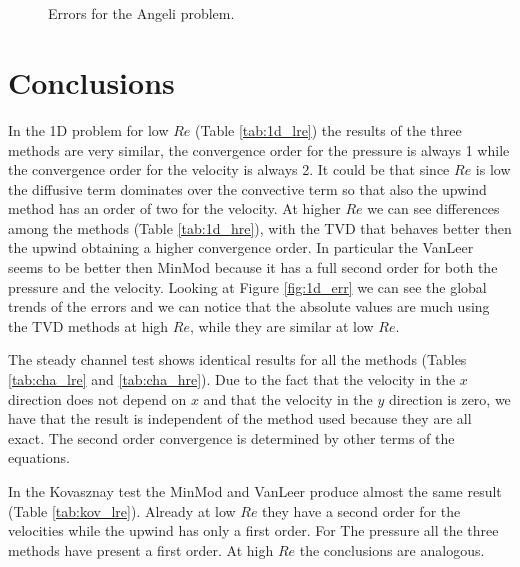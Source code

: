 \documentclass[11pt, a4paper]{article}
\theoremstyle{definition}
\begin{document}
\begin{figure}[t]
	\centering
	\subfloat[][Angeli, Upwind, $Re = 1$]{
		}
	\subfloat[][Angeli, Upwind, $Re = 1000$]{
		}\\
	\subfloat[][Angeli, MinMod, $Re = 1$]{
		}
	\subfloat[][Angeli, MinMod, $Re = 1000$]{
		}\\
	\subfloat[][Angeli, VanLeer, $Re = 1$]{
		}
	\subfloat[][Angeli, VanLeer, $Re = 1000$]{
		}
	\caption{Errors for the Angeli problem.}
	\label{fig:ang_err}
\end{figure}

\section{Conclusions}
In the 1D problem for low $Re$ (Table \ref{tab:1d_lre}) the results of the 
three 
methods are very similar, the convergence order for the pressure is always 1 
while the convergence order for the velocity is always 2. It could be that 
since $Re$ is low the diffusive term dominates over the convective term so that 
also the upwind method has an order of two for the velocity. At higher 
$Re$ we can see differences among the methods (Table \ref{tab:1d_hre}), with 
the TVD 
that behaves better then the upwind obtaining a  higher convergence order. In 
particular the VanLeer seems to be 
better then MinMod because it has a full second order for both the pressure and 
the velocity. Looking at Figure \ref{fig:1d_err} we can see the global trends 
of the errors and we can notice that the absolute values are much using the TVD 
methods at high $Re$, while they are similar at low $Re$.

The steady channel test shows identical results for all the methods (Tables 
\ref{tab:cha_lre} and \ref{tab:cha_hre}). Due to the 
fact that the velocity in the $x$ direction does not depend on $x$ and that the 
velocity in the $y$ direction is zero, we have that the result is independent 
of the method used because they are all exact. The second order convergence is 
determined by other terms of the equations.

In the Kovasznay test the MinMod and VanLeer produce almost the same result 
(Table \ref{tab:kov_lre}). Already at low $Re$ they have a second order for the 
velocities while the upwind has only a first order. For The pressure all the 
three methods have present a first order. At high $Re$ the conclusions are 
analogous.
\end{document}

